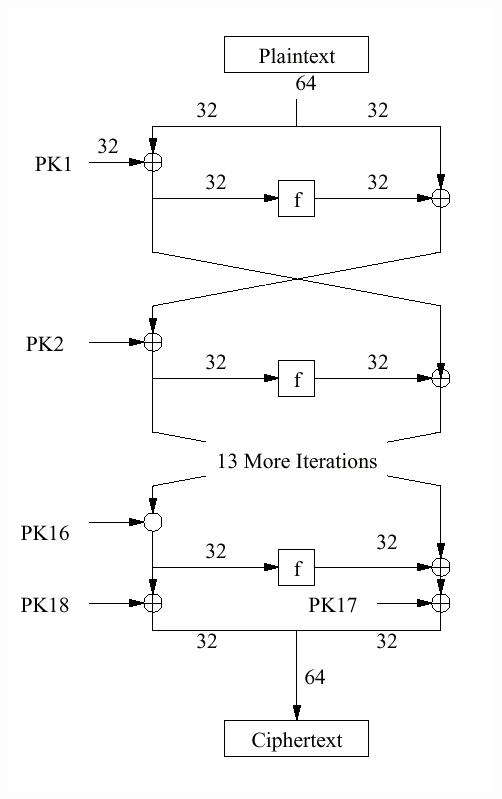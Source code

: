 \documentclass[10pt, a4paper,headsepline]{scrreprt}
\begin{document}
\begin{minipage}[t]{4cm}
\vspace{0pt}
\centering
\includegraphics[scale=0.3]{blowfish_1.JPG}
\end{minipage}
\hfill
\begin{minipage}[t]{1cm}
\vspace{0pt}
\end{minipage}
\end{document}
